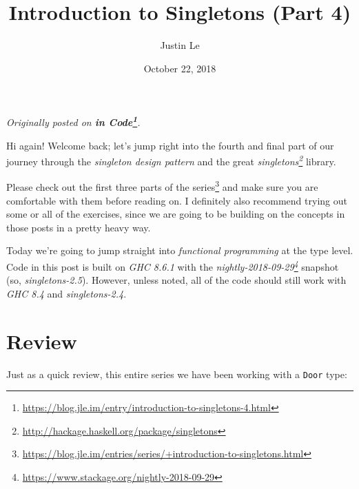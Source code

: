 \documentclass[]{article}
\title{Introduction to Singletons (Part 4)}
\author{Justin Le}
\date{October 22, 2018}
\newenvironment{Shaded}{}{}
\newcommand{\CommentTok}[1]{\textcolor[rgb]{0.38,0.63,0.69}{\textit{#1}}}
\newcommand{\DataTypeTok}[1]{\textcolor[rgb]{0.56,0.13,0.00}{#1}}
\newcommand{\FunctionTok}[1]{\textcolor[rgb]{0.02,0.16,0.49}{#1}}
\newcommand{\KeywordTok}[1]{\textcolor[rgb]{0.00,0.44,0.13}{\textbf{#1}}}
\newcommand{\NormalTok}[1]{#1}
\newcommand{\OtherTok}[1]{\textcolor[rgb]{0.00,0.44,0.13}{#1}}
\renewcommand{\href}[2]{#2\footnote{\url{#1}}}
\begin{document}
\maketitle

\emph{Originally posted on
\textbf{\href{https://blog.jle.im/entry/introduction-to-singletons-4.html}{in
Code}}.}

Hi again! Welcome back; let's jump right into the fourth and final part of our
journey through the \emph{singleton design pattern} and the great
\emph{\href{http://hackage.haskell.org/package/singletons}{singletons}} library.

Please check out
\href{https://blog.jle.im/entries/series/+introduction-to-singletons.html}{the
first three parts of the series} and make sure you are comfortable with them
before reading on. I definitely also recommend trying out some or all of the
exercises, since we are going to be building on the concepts in those posts in a
pretty heavy way.

Today we're going to jump straight into \emph{functional programming} at the
type level. Code in this post is built on \emph{GHC 8.6.1} with the
\emph{\href{https://www.stackage.org/nightly-2018-09-29}{nightly-2018-09-29}}
snapshot (so, \emph{singletons-2.5}). However, unless noted, all of the code
should still work with \emph{GHC 8.4} and \emph{singletons-2.4}.

\hypertarget{review}{%
\section{Review}\label{review}}

Just as a quick review, this entire series we have been working with a
\texttt{Door} type:

\begin{Shaded}
\end{Shaded}
\end{document}
